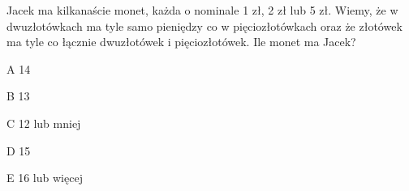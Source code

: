 \begin{tresc}
Jacek ma kilkanaście monet, każda o nominale 1 zł, 2 zł lub 5 zł. Wiemy, że w dwuzłotówkach ma tyle samo pieniędzy co w pięciozłotówkach oraz że złotówek ma tyle co łącznie dwuzłotówek i pięciozłotówek. Ile monet ma Jacek?
\end{tresc}
\begin{wariant}{A} 14 \end{wariant}
\begin{wariant}{B} 13 \end{wariant}
\begin{wariant}{C} 12 lub mniej \end{wariant}
\begin{wariant}{D} 15 \end{wariant}
\begin{wariant}{E} 16 lub więcej \end{wariant}
